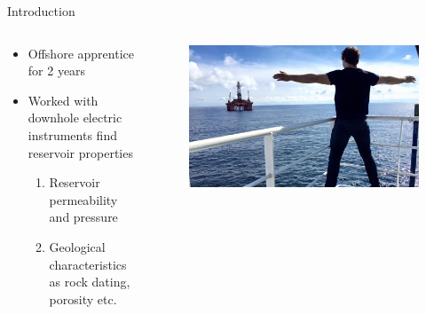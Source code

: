     \begin{frame}{Introduction}
        \begin{columns}
            \begin{column}{0.5\textwidth}
                \begin{itemize}
                    \item Offshore apprentice for 2 years
                    \item Worked with downhole electric instruments find reservoir properties
                        \begin{enumerate}
                            \item Reservoir permeability and pressure
                            \item Geological characteristics as rock dating, porosity etc.
                        \end{enumerate}
                \end{itemize}
            \end{column}

            \begin{column}{0.5\textwidth}
                \begin{figure}
                    \centering
                    \includegraphics[width=1.0\textwidth]{figures/offshore.jpg}
                \end{figure}
            \end{column}
        \end{columns}
    \end{frame}



